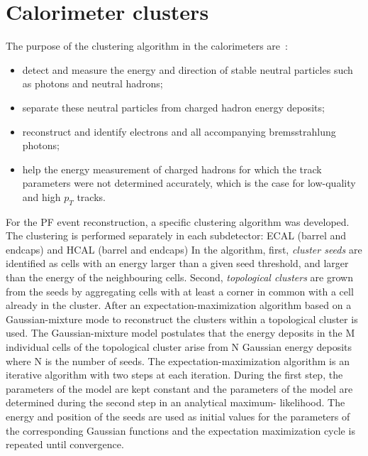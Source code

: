 \section{Calorimeter clusters}
The purpose of the clustering algorithm in the calorimeters are~\cite{Sirunyan:2017ulk}:
\begin{itemize} 
\item detect and measure the energy and direction of stable neutral particles such as photons and neutral hadrons;
\item separate these neutral particles from charged hadron energy deposits;
\item reconstruct and identify electrons and all accompanying bremsstrahlung photons;
\item help the energy measurement of charged hadrons for which the track parameters were not determined accurately,
which is the case for low-quality and high $p_T$ tracks.
\end{itemize}
For the PF event reconstruction, a  specific clustering algorithm was developed. 
The clustering is performed separately in each subdetector: ECAL (barrel and endcaps) and HCAL (barrel and endcaps)
In the algorithm, first, \textit{cluster seeds} are identified   as cells with an energy larger than a given seed threshold, and
larger than the energy of the neighbouring cells. Second, \textit{topological clusters} are grown from the seeds by aggregating cells with at least a corner in common with a cell already in the cluster.
After an expectation-maximization algorithm based on a Gaussian-mixture mode to
reconstruct the clusters within a topological cluster is used.
The Gaussian-mixture model postulates
that the energy deposits in the M individual cells of the topological cluster arise from N Gaussian energy deposits where N is the number of seeds. 
The expectation-maximization algorithm is an iterative algorithm with two steps at each iteration.
During the first step, the parameters of the model are kept constant and the parameters of the model are determined during the second step in an analytical maximum-
likelihood. 
The energy and position of the seeds are used as initial values for the parameters of the corresponding 
Gaussian functions and the expectation maximization cycle is repeated until convergence.

